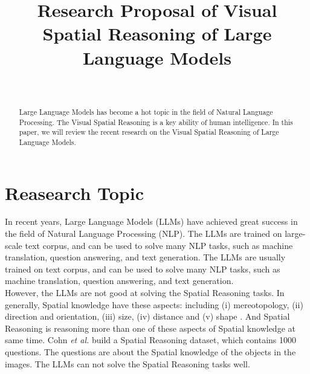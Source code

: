 \documentclass[journal,10pt]{IEEEtran}
\author{
    \IEEEauthorblockN{Jinlong Liu}\\
    \IEEEauthorblockA{Department of Computer Science, University of Liverpool
    \\J.Liu157@liverpool.ac.uk}
}
\title{Research Proposal of Visual Spatial Reasoning of Large Language Models}
\begin{document}
\maketitle
\begin{abstract}
Large Language Models has become a hot topic in the field of Natural Language Processing. The Visual Spatial Reasoning is a key ability of human intelligence. In this paper, we will review the recent research on the Visual Spatial Reasoning of Large Language Models.
\end{abstract}
\section{Reasearch Topic}
In recent years, Large Language Models (LLMs) have achieved great success in the field of Natural Language Processing (NLP). The LLMs are trained on large-scale text corpus, and can be used to solve many NLP tasks, such as machine translation, question answering, and text generation. The LLMs are usually trained on text corpus, and can be used to solve many NLP tasks, such as machine translation, question answering, and text generation. \\
However, the LLMs are not good at solving the Spatial Reasoning tasks. In generally, Spatial knowledge have these aspects: including (i) mereotopology, (ii) direction and orientation, (iii) size, (iv) distance and (v) shape \cite{cohn2008qualitative}. And Spatial Reasoning is  reasoning more than one of these aspects of Spatial knowledge at same time. Cohn \textit{et al.} \cite{cohn2023dialectical} build a Spatial Reasoning dataset, which contains 1000 questions. The questions are about the Spatial knowledge of the objects in the images. The LLMs can not solve the Spatial Reasoning tasks well. \\




\end{document}
